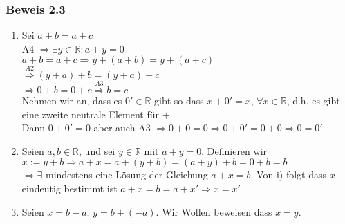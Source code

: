 \begin{enumerate}
\subsubsection*{Beweis 2.3}
\begin{enumerate}
\item Sei $a+b=a+c$\\ A4 $\Rightarrow\exists y\in\mathbb{R}:a+y=0$\\$a+b=a+c\Rightarrow y+(a+b)=y+(a+c)$\\$\mathop  \Rightarrow \limits^{A2} (y+a)+b=(y+a)+c$\\$\Rightarrow 0+b=0+c \mathop  \Rightarrow \limits^{A3} b=c$\\
Nehmen wir an, dass es $0'\in\mathbb{R}$ gibt so dass $x+0'=x$, $\forall x\in\mathbb{R}$, d.h. es gibt eine zweite neutrale Element für $+$.\\

\noindent Dann $0+0'=0$ aber auch A3 $\Rightarrow 0+0=0\Rightarrow 0+0'=0+0\Rightarrow 0=0'$
\item Seien $a,b\in\mathbb{R}$, und sei $y\in\mathbb{R}$ mit $a+y=0$. Definieren wir $x:=y+b\Rightarrow a+x=a+(y+b)=(a+y)+b=0+b=b$\\
$\Rightarrow \exists$ mindestens eine Lösung der Gleichung $a+x=b$. Von i) folgt dass $x$ eindeutig bestimmt ist $a+x=b=a+x' \Rightarrow x=x'$
\item Seien $x=b-a$, $y=b+(-a)$. Wir Wollen beweisen dass $x=y$.\\


\end{enumerate}
\end{enumerate}
